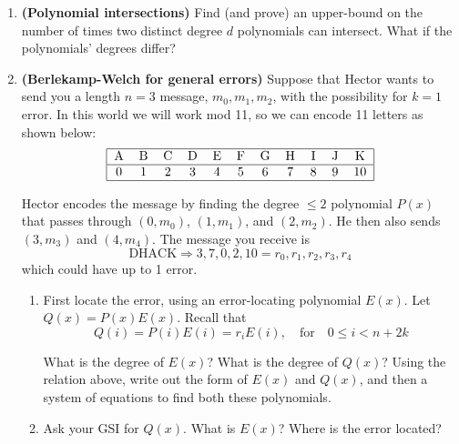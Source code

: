\documentclass[11pt]{article}
\newif\ifsolutions
\begin{document}
\maketitle

\begin{enumerate}

% 
\item {\bf (Polynomial intersections)} Find (and prove) an upper-bound on the number of times two distinct degree $d$ polynomials can intersect. What if the polynomials' degrees differ?

\vspace{20mm}

\ifsolutions
\textbf{Motivation for Problem:} 

\textbf{Solutions:} 
\fi


\item {\bf (Berlekamp-Welch for general errors)} Suppose that Hector wants to send you a length $n=3$ message, $m_0,m_1,m_2$, with the possibility for $k=1$ error. In this world we will work mod 11, so we can encode 11 letters as shown below:
\[ \begin{tabular}{|ccccccccccc|}
\hline
A & B & C & D & E & F & G & H & I & J & K \\
\hline
0 & 1 & 2 & 3 & 4 & 5 & 6 & 7& 8 & 9 & 10 \\
\hline
\end{tabular} \]

Hector encodes the message by finding the degree $\leq 2$ polynomial $P(x)$ that passes through $(0,m_0)$, $(1,m_1)$, and $(2,m_2)$. He then also sends $(3,m_3)$ and $(4,m_4)$. The message you receive is 
\[ \text{DHACK} \Rightarrow 3,7,0,2,10 = r_0,r_1,r_2,r_3,r_4 \]
which could have up to 1 error.

\begin{enumerate}
\item First locate the error, using an error-locating polynomial $E(x)$.  Let $Q(x) = P(x)E(x)$. Recall that
\[ Q(i) = P(i)E(i) = r_i E(i), \quad \text{for} \quad 0 \leq i < n+2k \]

What is the degree of $E(x)$? What is the degree of $Q(x)$? Using the relation above, write out the form of $E(x)$ and $Q(x)$, and then a system of equations to find both these polynomials.
\vspace{20mm}

\item Ask your GSI for $Q(x)$. What is $E(x)$? Where is the error located?
\vspace{20mm}


\end{enumerate}
\end{enumerate}
\end{document}
